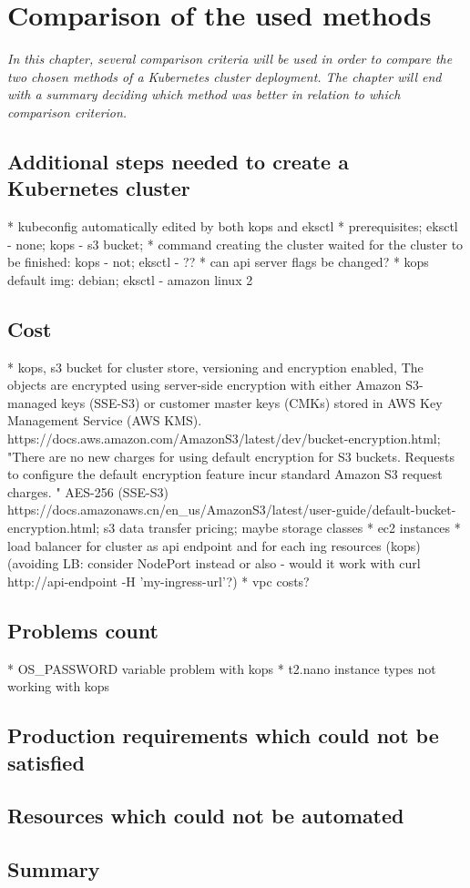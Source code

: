 \section{Comparison of the used methods}
\textit{In this chapter, several comparison criteria will be used in order to compare the two chosen methods of a Kubernetes cluster deployment. The chapter will end with a summary deciding which method was better in relation to which comparison criterion.}

\subsection{Additional steps needed to create a Kubernetes cluster}
* kubeconfig automatically edited by both kops and eksctl
* prerequisites; eksctl - none; kops - s3 bucket;
* command creating the cluster waited for the cluster to be finished: kops - not; eksctl - ??
* can api server flags be changed?
* kops default img: debian; eksctl - amazon linux 2

\subsection{Cost}

* kops, s3 bucket for cluster store, versioning and encryption enabled,  The objects are encrypted using server-side encryption with either Amazon S3-managed keys (SSE-S3) or customer master keys (CMKs) stored in AWS Key Management Service (AWS KMS). https://docs.aws.amazon.com/AmazonS3/latest/dev/bucket-encryption.html; "There are no new charges for using default encryption for S3 buckets. Requests to configure the default encryption feature incur standard Amazon S3 request charges. " AES-256 (SSE-S3) https://docs.amazonaws.cn/en_us/AmazonS3/latest/user-guide/default-bucket-encryption.html; s3 data transfer pricing; maybe storage classes
* ec2 instances
* load balancer for cluster as api endpoint and for each ing resources (kops) (avoiding LB: consider NodePort instead or also - would it work with curl http://api-endpoint -H 'my-ingress-url'?)
* vpc costs?

\subsection{Problems count}
* OS_PASSWORD variable problem with kops
* t2.nano instance types not working with kops

\subsection{Production requirements which could not be satisfied}
\subsection{Resources which could not be automated}
\subsection{Summary}

